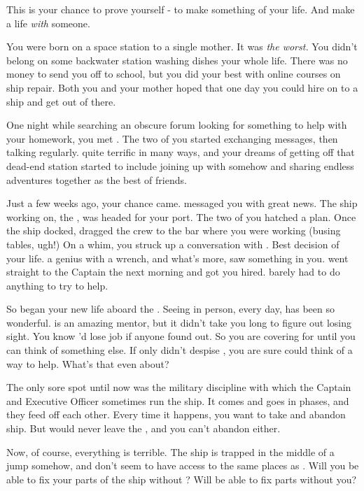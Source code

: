 \documentclass[char]{TMFHope}
\begin{document}
\name{\cBoy{}}

This is your chance to prove yourself - to make something of your life. And make a life \emph{with} someone.

You were born on a space station to a single mother. It was \emph{the worst.} You didn't belong on some backwater station washing dishes your whole life. There was no money to send you off to school, but you did your best with online courses on ship repair. Both you and your mother hoped that one day you could hire on to a ship and get out of there. 

One night while searching an obscure forum looking for something to help with your homework, you met \cNav{}. The two of you started exchanging messages, then talking regularly. \cNav{\They} \cNav{\are} quite terrific in many ways, and your dreams of getting off that dead-end station started to include joining up with \cNav{} somehow and sharing endless adventures together as the best of friends.

Just a few weeks ago, your chance came. \cNav{} messaged you with great news. The ship \cNav{\they} \cNav{\are} working on, the \pNew{}, was headed for your port. The two of you hatched a plan. Once the ship docked, \cNav{} dragged the crew to the bar where you were working (busing tables, ugh!) On a whim, you struck up a conversation with \cEng{}. Best decision of your life. \cEng{\They} \cEng{\are} a genius with a wrench, and what's more, \cEng{\they} saw something in you. \cEng{\They} went straight to the Captain the next morning and got you hired. \cNav{} barely had to do anything to try to help.

So began your new life aboard the \pNew{}. Seeing \cNav{} in person, every day, has been so wonderful. \cEng{} is an amazing mentor, but it didn't take you long to figure out \cEng{\they} \cEng{\are} losing \cEng{\their} sight. You know \cEng{\they}'d lose \cEng{\their} job if anyone found out. So you are covering for \cEng{} until you can think of something else. If only \cEng{} didn't despise \cNav{}, you are sure \cNav{} could think of a way to help. What's that even about?

The only sore spot until now was the military discipline with which the Captain and Executive Officer sometimes run the ship. It comes and goes in phases, and they feed off each other. Every time it happens, you want to take \cNav{} and abandon ship. But \cEng{} would never leave the \pNew{}, and you can't abandon \cEng{\them} either.

Now, of course, everything is terrible. The ship is trapped in the middle of a jump somehow, and don't seem to have access to the same places as \cEng{}. Will you be able to fix your parts of the ship without \cEng{\them}? Will \cEng{\they} be able to fix \cEng{\their} parts without you?
\end{document}
